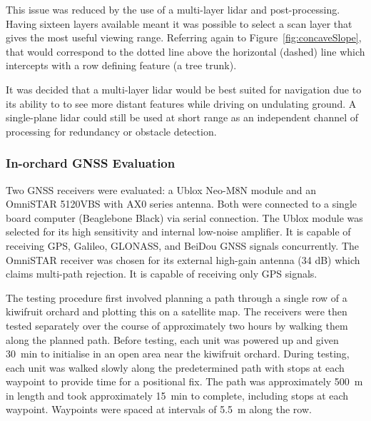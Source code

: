 \documentclass[preprint,authoryear,12pt]{elsarticle}
\begin{document}
        This issue was reduced by the use of a multi-layer lidar and post-processing.
        Having sixteen layers available meant it was possible to select a scan layer that gives the most useful viewing range.
        Referring again to Figure~\ref{fig:concaveSlope}, that would correspond to the dotted line above the horizontal (dashed) line which intercepts with a row defining feature (a tree trunk).

        It was decided that a multi-layer lidar would be best suited for navigation due to its ability to to see more distant features while driving on undulating ground.
        A single-plane lidar could still be used at short range as an independent channel of processing for redundancy or obstacle detection.

    \subsubsection{In-orchard GNSS Evaluation}
        Two GNSS receivers were evaluated: a Ublox Neo-M8N module and an OmniSTAR 5120VBS with AX0 series antenna.
    	Both were connected to a single board computer (Beaglebone Black) via serial connection.
        The Ublox module was selected for its high sensitivity and internal low-noise amplifier.
        It is capable of receiving GPS, Galileo, GLONASS, and BeiDou GNSS signals concurrently.
        The OmniSTAR receiver was chosen for its external high-gain antenna (34 dB) which claims multi-path rejection.
        It is capable of receiving only GPS signals.

        The testing procedure first involved planning a path through a single row of a kiwifruit orchard and plotting this on a satellite map.
        The receivers were then tested separately over the course of approximately two hours by walking them along the planned path.
        Before testing, each unit was powered up and given \SI{30}{\minute} to initialise in an open area near the kiwifruit orchard.
        During testing, each unit was walked slowly along the predetermined path with stops at each waypoint to provide time for a positional fix.
        The path was approximately \SI{500}{\meter} in length and took approximately \SI{15}{\minute} to complete, including stops at each waypoint.
        Waypoints were spaced at intervals of \SI{5.5}{\meter} along the row.
\end{document}
